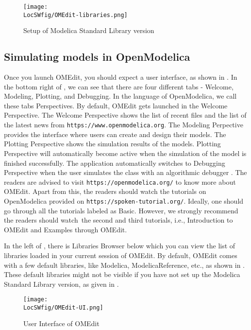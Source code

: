 \begin{figure}
      \centering
      \texttt{[image: \\LocSWfig/OMEdit-libraries.png]}
      \caption{Setup of Modelica Standard Library version}
      \label{om-help}
\end{figure}

\subsection{Simulating models in OpenModelica}\label{OpenModelica-code-execution}
Once you launch OMEdit, you should expect a user interface, 
as shown in . In the bottom right of , we can 
see that there are four different tabs - Welcome, Modeling, Plotting, and 
Debugging. In the language of OpenModelica, we call these tabs Perspectives. 
By default, OMEdit gets launched in the Welcome Perspective. 
The Welcome Perspective shows the list of recent files and the list of the 
latest news from {\tt https://www.openmodelica.org}. 
The Modeling Perpective provides the 
interface where users can create and design their models. 
The Plotting Perspective shows the simulation results of the models. 
Plotting Perspective will automatically become active 
when the simulation of the model is finished successfully. 
The application automatically switches to Debugging Perspective 
when the user simulates the class with an algorithmic debugger \cite{om-ref}. The readers 
are advised to visit {\tt https://openmodelica.org/} to know more about OMEdit. Apart
from this, the readers should watch the tutorials on 
OpenModelica provided on {\tt https://spoken-tutorial.org/}. Ideally, one should 
go through all the tutorials labeled as Basic. However, we strongly recommend the readers should watch the second and third tutorials, i.e., 
Introduction to OMEdit and Examples through OMEdit. 

In the left of , there is Libraries Browser below which you can view
the list of libraries loaded in your current session of OMEdit. By default, OMEdit 
comes with a few default libraries, like Modelica, ModelicaReference, etc., as shown in
. These default libraries might not be visible if you have not set up the
Modelica Standard Library version, as given in . 
\begin{figure}
      \centering
      \texttt{[image: \\LocSWfig/OMEdit-UI.png]}
      \caption{User Interface of OMEdit}
      \label{om-ui}
\end{figure}

